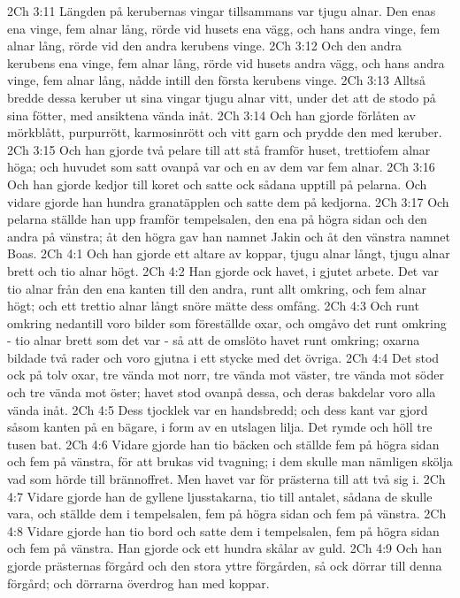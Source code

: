 2Ch 3:11  Längden på kerubernas vingar tillsammans var tjugu alnar. Den enas ena vinge, fem alnar lång, rörde vid husets ena vägg, och hans andra vinge, fem alnar lång, rörde vid den andra kerubens vinge.
2Ch 3:12  Och den andra kerubens ena vinge, fem alnar lång, rörde vid husets andra vägg, och hans andra vinge, fem alnar lång, nådde intill den första kerubens vinge.
2Ch 3:13  Alltså bredde dessa keruber ut sina vingar tjugu alnar vitt, under det att de stodo på sina fötter, med ansiktena vända inåt.
2Ch 3:14  Och han gjorde förlåten av mörkblått, purpurrött, karmosinrött och vitt garn och prydde den med keruber.
2Ch 3:15  Och han gjorde två pelare till att stå framför huset, trettiofem alnar höga; och huvudet som satt ovanpå var och en av dem var fem alnar.
2Ch 3:16  Och han gjorde kedjor till koret och satte ock sådana upptill på pelarna. Och vidare gjorde han hundra granatäpplen och satte dem på kedjorna.
2Ch 3:17  Och pelarna ställde han upp framför tempelsalen, den ena på högra sidan och den andra på vänstra; åt den högra gav han namnet Jakin och åt den vänstra namnet Boas.
2Ch 4:1  Och han gjorde ett altare av koppar, tjugu alnar långt, tjugu alnar brett och tio alnar högt.
2Ch 4:2  Han gjorde ock havet, i gjutet arbete. Det var tio alnar från den ena kanten till den andra, runt allt omkring, och fem alnar högt; och ett trettio alnar långt snöre mätte dess omfång.
2Ch 4:3  Och runt omkring nedantill voro bilder som föreställde oxar, och omgåvo det runt omkring - tio alnar brett som det var - så att de omslöto havet runt omkring; oxarna bildade två rader och voro gjutna i ett stycke med det övriga.
2Ch 4:4  Det stod ock på tolv oxar, tre vända mot norr, tre vända mot väster, tre vända mot söder och tre vända mot öster; havet stod ovanpå dessa, och deras bakdelar voro alla vända inåt.
2Ch 4:5  Dess tjocklek var en handsbredd; och dess kant var gjord såsom kanten på en bägare, i form av en utslagen lilja. Det rymde och höll tre tusen bat.
2Ch 4:6  Vidare gjorde han tio bäcken och ställde fem på högra sidan och fem på vänstra, för att brukas vid tvagning; i dem skulle man nämligen skölja vad som hörde till brännoffret. Men havet var för prästerna till att två sig i.
2Ch 4:7  Vidare gjorde han de gyllene ljusstakarna, tio till antalet, sådana de skulle vara, och ställde dem i tempelsalen, fem på högra sidan och fem på vänstra.
2Ch 4:8  Vidare gjorde han tio bord och satte dem i tempelsalen, fem på högra sidan och fem på vänstra. Han gjorde ock ett hundra skålar av guld.
2Ch 4:9  Och han gjorde prästernas förgård och den stora yttre förgården, så ock dörrar till denna förgård; och dörrarna överdrog han med koppar.
